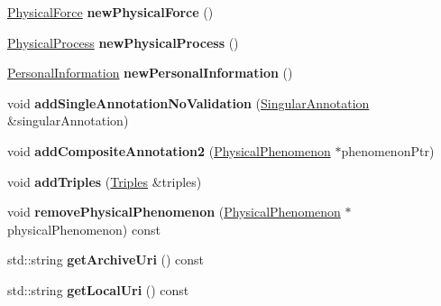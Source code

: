 \begin{DoxyCompactItemize}
\hyperlink{classomexmeta_1_1PhysicalForce}{Physical\+Force} {\bfseries new\+Physical\+Force} ()
\item 
\mbox{\label{classomexmeta_1_1Editor_a2815d918736ee17d07306c5cf07c8ebf}} 
\hyperlink{classomexmeta_1_1PhysicalProcess}{Physical\+Process} {\bfseries new\+Physical\+Process} ()
\item 
\mbox{\label{classomexmeta_1_1Editor_a1943079ddbc4a4c6d896f51f360a11df}} 
\hyperlink{classomexmeta_1_1PersonalInformation}{Personal\+Information} {\bfseries new\+Personal\+Information} ()
\item 
\mbox{\label{classomexmeta_1_1Editor_a8fb3a19e8f64aeff2ac9b78c483843de}} 
void {\bfseries add\+Single\+Annotation\+No\+Validation} (\hyperlink{classomexmeta_1_1Triple}{Singular\+Annotation} \&singular\+Annotation)
\item 
\mbox{\label{classomexmeta_1_1Editor_ad05d04a31263f9c7cb8105e29fd9d158}} 
void {\bfseries add\+Composite\+Annotation2} (\hyperlink{classomexmeta_1_1PhysicalPhenomenon}{Physical\+Phenomenon} $\ast$phenomenon\+Ptr)
\item 
\mbox{\label{classomexmeta_1_1Editor_ace8ee873498fa72b63c0747775b729f5}} 
void {\bfseries add\+Triples} (\hyperlink{classomexmeta_1_1Triples}{Triples} \&triples)
\item 
\mbox{\label{classomexmeta_1_1Editor_af00f00108238acbf2b2974cedc07b454}} 
void {\bfseries remove\+Physical\+Phenomenon} (\hyperlink{classomexmeta_1_1PhysicalPhenomenon}{Physical\+Phenomenon} $\ast$physical\+Phenomenon) const
\item 
\mbox{\label{classomexmeta_1_1Editor_a736e49794c5a358f06d13d41c3657fe2}} 
std\+::string {\bfseries get\+Archive\+Uri} () const
\item 
\mbox{\label{classomexmeta_1_1Editor_a8494826923de713c19f971fd9c7908c0}} 
std\+::string {\bfseries get\+Local\+Uri} () const
\item 
\mbox{\label{classomexmeta_1_1Editor_a0020d3b9c3e91fb37c134ba8b211c13e}} 

\end{DoxyCompactItemize}
